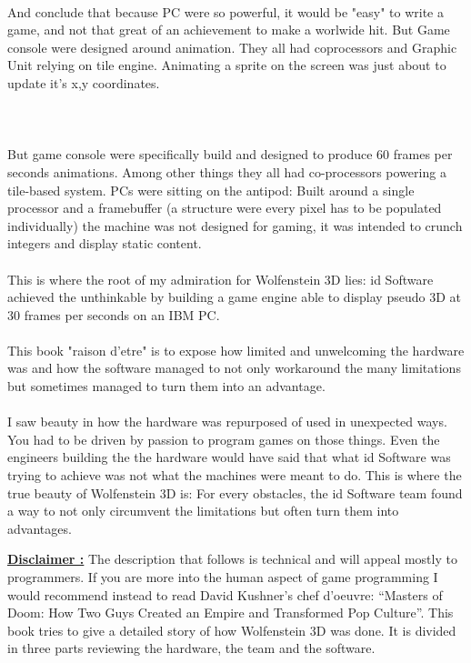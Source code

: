 \\
And conclude that because PC were so powerful, it would be "easy" to write a game, and not that great of an achievement to make a worlwide hit. But Game console were designed around animation. They all had coprocessors and Graphic Unit relying on tile engine. Animating a sprite on the screen was just about to update it's {x,y} coordinates.\\
\\
\\
\\
But game console were specifically build and designed to produce 60 frames per seconds animations. Among other things they all had co-processors powering a tile-based system. PCs were sitting on the antipod: Built around a single processor and a framebuffer (a structure were every pixel has to be populated individually) the machine was not designed for gaming, it was intended to crunch integers and display static content.\\
\\
This is where the root of my admiration for Wolfenstein 3D lies: id Software achieved the unthinkable by building a game engine able to display pseudo 3D at 30 frames per seconds on an IBM PC.\\
\\
This book "raison d'etre" is to expose how limited and unwelcoming the hardware was and how the software managed to not only workaround the many limitations but sometimes managed to turn them into an advantage.\\
\\
I saw beauty in how the hardware was repurposed of used in unexpected ways. You had to be driven by passion to program games on those things. Even the engineers building the the hardware would have said that what id Software was trying to achieve was not what the machines were meant to do. This is where the true beauty of Wolfenstein 3D is: For every obstacles, the id Software team found a way to not only circumvent the limitations but often turn them into advantages.

\bigskip

 \textbf{\underline{Disclaimer :}} The description that follows is technical and will appeal mostly to programmers. If you are more into the human aspect of game programming I would recommend instead to read David Kushner’s chef d’oeuvre: “Masters of Doom: How Two Guys Created an Empire and Transformed Pop Culture”.
This book tries to give a detailed story of how Wolfenstein 3D was done. It is divided in three parts reviewing the hardware, the team and the software.